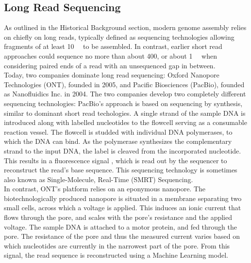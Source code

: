 \newpage
\subsection*{Long Read Sequencing}

As outlined in the Historical Background section, modern genome assembly relies on chiefly on long reads, typically defined as sequencing technologies allowing fragments of at least \qty{10}{\kilo\bp} to be assembled.
In contrast, earlier short read approaches could sequence no more than about \qty{400}{\bp}, or about \qty{1}{\kilo\bp} when considering paired ends of a read with an unsequenced gap in between.\\
Today, two companies dominate long read sequencing: Oxford Nanopore Technologies (ONT), founded in 2005, and Pacific Biosciences (PacBio), founded as Nanofluidics Inc. in 2004.
The two companies develop two completely different sequencing technologies:
PacBio's approach is based on sequencing by synthesis, similar to dominant short read techologies.
A single strand of the sample DNA is introduced along with labelled nucleotides to the flowcell serving as a consumable reaction vessel.
The flowcell is studded with individual DNA polymerases, to which the DNA can bind.
As the polymerase synthesizes the complementary strand to the input DNA, the label is cleaved from the incorporated nucleotide.
This results in a fluorescence signal%
, which is read out by the sequencer to reconstruct the read's base sequence.
This sequencing technology is sometimes also known as Single-Molecule, Real-Time (SMRT) Sequencing\cite{pbtech}.\\
In contrast, ONT's platform relies on an eponymous nanopore.
The biotechnologically produced nanopore is situated in a membrane separating two small cells, across which a voltage is applied.
This induces an ionic current that flows through the pore, and scales with the pore's resistance and the applied voltage\cite{onttech}.
The sample DNA is attached to a motor protein, and fed through the pore.
The resistance of the pore and thus the measured current varies based on which nucleotides are currently in the narrowest part of the pore.
From this signal, the read sequence is reconstructed using a Machine Learning model\cite{onttech, wang21}.

